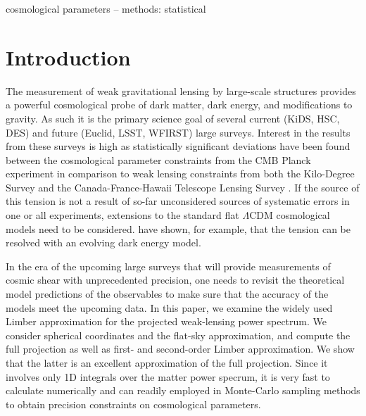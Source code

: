 \documentclass[useAMS,usenatbib]{mn2e} %
\begin{document}
\begin{keywords}
cosmological parameters -- methods: statistical
\end{keywords}



\section{Introduction}
\label{sec:intro}

The measurement of weak gravitational lensing by large-scale structures
provides a powerful cosmological probe of dark matter, dark energy, and
modifications to gravity.  As such it is the primary science goal of several
current (KiDS, HSC, DES) and future (Euclid, LSST, WFIRST) large surveys.
Interest in the results from these surveys is high as statistically significant
deviations have been found between the cosmological parameter constraints from
the CMB Planck experiment \citep{2015arXiv150201589P} in comparison to weak
lensing constraints from both the Kilo-Degree Survey \citep[KiDS;][]{KiDS-450}
and the Canada-France-Hawaii Telescope Lensing Survey
\citep[CFHTLenS;][]{2016arXiv160105786J}.  If the source of this tension is not
a result of so-far unconsidered sources of systematic errors in one or all
experiments, extensions to the standard flat $\Lambda$CDM cosmological models
need to be considered. \citet{joudaki/etal:2017} have shown, for example, that
the tension can be resolved with an evolving dark energy model.

In the era of the upcoming large surveys that will provide measurements of
cosmic shear with unprecedented precision, one needs to revisit the theoretical
model predictions of the observables to make sure that the accuracy of the
models meet the upcoming data. In this paper, we examine the widely used Limber
approximation for the projected weak-lensing power spectrum. We consider
spherical coordinates and the flat-sky approximation, and compute the full
projection as well as first- and second-order Limber approximation. We show
that the latter is an excellent approximation of the full projection. Since it
involves only 1D integrals over the matter power specrum, it is very fast to
calculate numerically and can readily employed in Monte-Carlo sampling methods
to obtain precision constraints on cosmological parameters.
\end{document}
